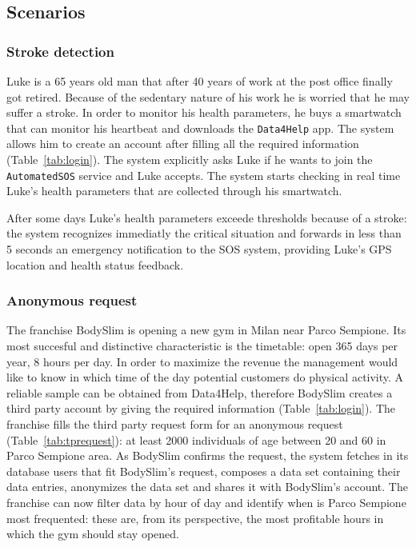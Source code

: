   \subsection{Scenarios}

    \subsubsection{Stroke detection}

      Luke is a 65 years old man that after 40 years of work at the post office finally got retired. Because of the sedentary nature of his work he is worried that he may suffer a stroke. In order to monitor his health parameters, he buys a smartwatch that can monitor his heartbeat and downloads the \texttt{Data4Help} app. The system allows him to create an account after filling all the required information (Table~\ref{tab:login}). The system explicitly asks Luke if he wants to join the \texttt{AutomatedSOS} service and Luke accepts. The system starts checking in real time Luke's health parameters that are collected through his smartwatch.

      After some days Luke's health parameters exceede thresholds because of a stroke: the system recognizes immediatly the critical situation and forwards in less than 5 seconds an emergency notification to the SOS system, providing Luke's GPS location and health status feedback.

    \subsubsection{Anonymous request}

      The franchise BodySlim is opening a new gym in Milan near Parco Sempione. Its most succesful and distinctive characteristic is the timetable: open 365 days per year, 8 hours per day. In order to maximize the revenue the management would like to know in which time of the day potential customers do physical activity. A reliable sample can be obtained from Data4Help, therefore BodySlim creates a third party account by giving the required information (Table~\ref{tab:login}). The franchise fills the third party request form for an anonymous request (Table~\ref{tab:tprequest}): at least 2000 individuals of age between 20 and 60 in Parco Sempione area. As BodySlim confirms the request, the system fetches in its database users that fit BodySlim's request, composes a data set containing their data entries, anonymizes the data set and shares it with BodySlim's account. The franchise can now filter data by hour of day and identify when is Parco Sempione most frequented: these are, from its perspective, the most profitable hours in which the gym should stay opened.

